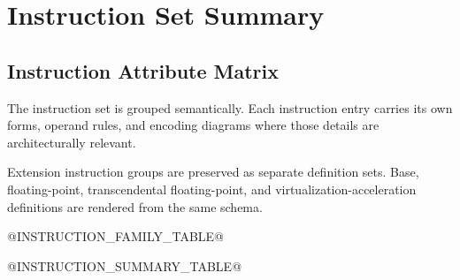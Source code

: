 \clearpage
\section{Instruction Set Summary}

\subsection{Instruction Attribute Matrix}
The instruction set is grouped semantically. Each instruction entry carries its own forms, operand rules, and
encoding diagrams where those details are architecturally relevant.

Extension instruction groups are preserved as separate definition sets. Base, floating-point, transcendental
floating-point, and virtualization-acceleration definitions are rendered from the same schema.

@INSTRUCTION_FAMILY_TABLE@

@INSTRUCTION_SUMMARY_TABLE@
